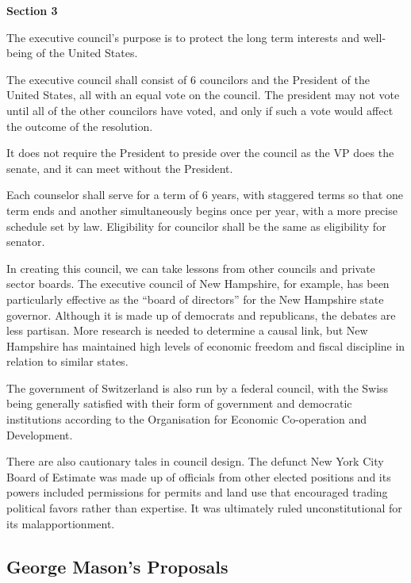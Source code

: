 \documentclass{article}
\begin{document}
\begin{quoting}
\textbf{Section 3}

The executive council’s purpose is to protect the long term interests and well-being of the United States.

The executive council shall consist of 6 councilors and the President of the United States, all with an equal vote on the council. The president may not vote until all of the other councilors have voted, and only if such a vote would affect the outcome of the resolution.
\end{quoting}

It does not require the President to preside over the council as the VP does the senate, and it can meet without the President.

\begin{quoting}
Each counselor shall serve for a term of 6 years, with staggered terms so that one term ends and another simultaneously begins once per year, with a more precise schedule set by law. Eligibility for councilor shall be the same as eligibility for senator.
\end{quoting}

In creating this council, we can take lessons from other councils and private sector boards\cite{Khanna}. The executive council of New Hampshire, for example, has been particularly effective as the “board of directors” for the New Hampshire state governor\cite{Hahn-Burkett}. Although it is made up of democrats and republicans, the debates are less partisan\cite{Timmins}. More research is needed to determine a causal link, but New Hampshire has maintained high levels of economic freedom and fiscal discipline in relation to similar states\cite{Ruger}.

The government of Switzerland is also run by a federal council, with the Swiss being generally satisfied with their form of government and democratic institutions according to the Organisation for Economic Co-operation and Development\cite{Kaufman}.

There are also cautionary tales in council design. The defunct New York City Board of Estimate was made up of officials from other elected positions and its powers included permissions for permits and land use that encouraged trading political favors rather than expertise\cite{Purnick}. It was ultimately ruled unconstitutional for its malapportionment\cite{Board_of_Estimate}.

\subsection{George Mason's Proposals}
\end{document}
